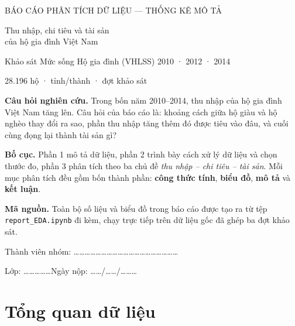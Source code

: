 \documentclass[11pt,a4paper]{article}
\begin{document}
\thispagestyle{empty}
\begin{center}
\vspace*{2cm}
{\footnotesize\color{blue}\MakeUppercase{Báo cáo phân tích dữ liệu — thống kê mô tả}\par}
\vspace{10pt}
{\fontsize{25}{30}\selectfont\heavy\color{ink} Thu nhập, chi tiêu và tài sản\\của hộ gia đình Việt Nam\par}
\vspace{10pt}
{\large\color{ink2} Khảo sát Mức sống Hộ gia đình (VHLSS) 2010 · 2012 · 2014\par}
\vspace{20pt}
{\color{ink2} 28.196 hộ \quad· tỉnh/thành \quad· đợt khảo sát\par}
\vspace{24pt}
\begin{tcolorbox}[colback=tintN, colframe=tintN, boxrule=0pt, arc=5pt, width=0.88\linewidth, left=14pt, right=14pt, top=10pt, bottom=10pt]
\small
\textbf{Câu hỏi nghiên cứu.} Trong bốn năm 2010–2014, thu nhập của hộ gia đình Việt Nam tăng lên. Câu hỏi của báo cáo là: khoảng cách giữa hộ giàu và hộ nghèo thay đổi ra sao, phần thu nhập tăng thêm đó được tiêu vào đâu, và cuối cùng đọng lại thành tài sản gì?\par
\vspace{6pt}
\textbf{Bố cục.} Phần 1 mô tả dữ liệu, phần 2 trình bày cách xử lý dữ liệu và chọn thước đo, phần 3 phân tích theo ba chủ đề \emph{thu nhập – chi tiêu – tài sản}. Mỗi mục phân tích đều gồm bốn thành phần: \textbf{công thức tính}, \textbf{biểu đồ}, \textbf{mô tả} và \textbf{kết luận}.\par
\vspace{6pt}
\textbf{Mã nguồn.} Toàn bộ số liệu và biểu đồ trong báo cáo được tạo ra từ tệp \texttt{report\_EDA.ipynb} đi kèm, chạy trực tiếp trên dữ liệu gốc đã ghép ba đợt khảo sát.
\end{tcolorbox}
\vspace{20pt}
{\color{muted} Thành viên nhóm: …………………………………………………\par\vspace{4pt} Lớp: ……………\qquad Ngày nộp: ……/……/………\par}
\end{center}
\newpage

{\small\tableofcontents}
\newpage

\section{Tổng quan dữ liệu}
\end{document}
